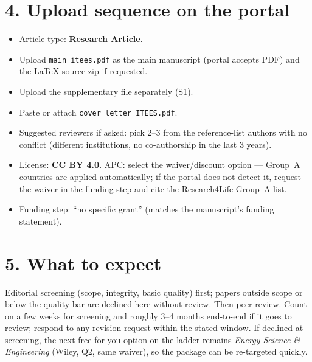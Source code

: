 \documentclass[11pt,a4paper]{article}
\newcommand{\boxitem}{\item[$\square$]}
\begin{document}
\section*{4. Upload sequence on the portal}
\begin{itemize}
\boxitem Article type: \textbf{Research Article}.
\boxitem Upload \texttt{main\_itees.pdf} as the main manuscript (portal accepts PDF) and the LaTeX source zip if requested.
\boxitem Upload the supplementary file separately (S1).
\boxitem Paste or attach \texttt{cover\_letter\_ITEES.pdf}.
\boxitem Suggested reviewers if asked: pick 2--3 from the reference-list authors with no conflict (different institutions, no co-authorship in the last 3 years).
\boxitem License: \textbf{CC BY 4.0}. APC: select the waiver/discount option --- Group~A countries are applied automatically; if the portal does not detect it, request the waiver in the funding step and cite the Research4Life Group~A list.
\boxitem Funding step: ``no specific grant'' (matches the manuscript's funding statement).
\end{itemize}

\section*{5. What to expect}
Editorial screening (scope, integrity, basic quality) first; papers outside scope or below the quality bar are declined here without review. Then peer review. Count on a few weeks for screening and roughly 3--4 months end-to-end if it goes to review; respond to any revision request within the stated window. If declined at screening, the next free-for-you option on the ladder remains \textit{Energy Science \& Engineering} (Wiley, Q2, same waiver), so the package can be re-targeted quickly.
\end{document}
